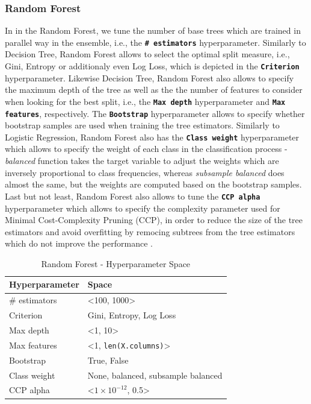 \subsubsection{Random Forest}
In in the Random Forest, we tune the number of base trees which are trained in parallel way in the ensemble, i.e., the \textbf{\texttt{\# estimators}} hyperparameter. 
Similarly to Decision Tree, Random Forest allows to select the optimal split measure, i.e., Gini, Entropy or additionaly even Log Loss, which is depicted in the \textbf{\texttt{Criterion}} hyperparameter.
Likewise Decision Tree, Random Forest also allows to specify the maximum depth of the tree as well as the  the number of features to consider when looking for the best split, i.e., the \textbf{\texttt{Max depth}} hyperparameter and \textbf{\texttt{Max features}}, respectively.
The \textbf{\texttt{Bootstrap}} hyperparameter allows to specify whether bootstrap samples are used when training the tree estimators.
Similarly to Logistic Regression, Random Forest also has the \textbf{\texttt{Class weight}} hyperparameter which allows to specify the weight of each class in the classification process - \textit{balanced} function takes the target variable to adjust the weights which are inversely proportional to class frequencies, whereas \textit{subsample balanced} does almost the same, but the weights are computed based on the bootstrap samples.
Last but not least, Random Forest also allows to tune the \textbf{\texttt{CCP alpha}} hyperparameter which allows to specify the complexity parameter used for Minimal Cost-Complexity Pruning (CCP), in order to reduce the size of the tree estimators and avoid overfitting by remocing subtrees from the tree estimators which do not improve the performance \citep{scikit-rf}.

\begin{table}[H]
\small
\setlength{\tabcolsep}{8pt}
\renewcommand{\arraystretch}{1.3}
\centering
    \caption[Random Forest - Hyperparameter Space]{Random Forest - Hyperparameter Space}\label{tab:rfspace}
    \begin{tabular}{ll}
\toprule
\textbf{Hyperparameter} & \textbf{Space}\\
\midrule
\hline
\# estimators & <100, 1000> \\
Criterion & Gini, Entropy, Log Loss \\
Max depth & <1, 10> \\
Max features & <1, \verb|len(X.columns)|>  \\
Bootstrap & True, False \\
Class weight & None, balanced, subsample balanced \\
CCP alpha & <$1\times10^{-12}$, 0.5> \\
\hline
\bottomrule
\end{tabular}
\vspace{0.7em}

\vspace{-1em}
\end{table}


